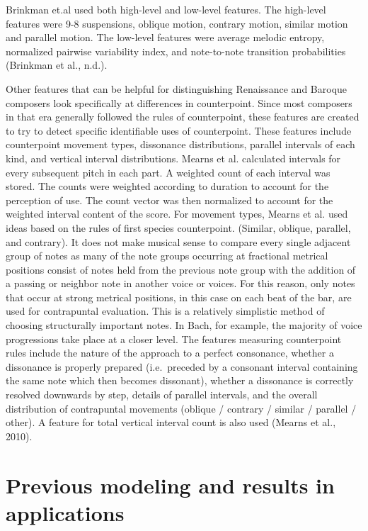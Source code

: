 \documentclass[12pt,twoside]{reedthesis}
\theoremstyle{definition}
\theoremstyle{definition}
\theoremstyle{definition}
\theoremstyle{remark}
\begin{document}
Brinkman et.al used both high-level and low-level features. The
high-level features were 9-8 suspensions, oblique motion, contrary
motion, similar motion and parallel motion. The low-level features were
average melodic entropy, normalized pairwise variability index, and
note-to-note transition probabilities (Brinkman et al., n.d.).

Other features that can be helpful for distinguishing Renaissance and
Baroque composers look specifically at differences in counterpoint.
Since most composers in that era generally followed the rules of
counterpoint, these features are created to try to detect specific
identifiable uses of counterpoint. These features include counterpoint
movement types, dissonance distributions, parallel intervals of each
kind, and vertical interval distributions. Mearns et al. calculated
intervals for every subsequent pitch in each part. A weighted count of
each interval was stored. The counts were weighted according to duration
to account for the perception of use. The count vector was then
normalized to account for the weighted interval content of the score.
For movement types, Mearns et al. used ideas based on the rules of first
species counterpoint. (Similar, oblique, parallel, and contrary). It
does not make musical sense to compare every single adjacent group of
notes as many of the note groups occurring at fractional metrical
positions consist of notes held from the previous note group with the
addition of a passing or neighbor note in another voice or voices. For
this reason, only notes that occur at strong metrical positions, in this
case on each beat of the bar, are used for contrapuntal evaluation. This
is a relatively simplistic method of choosing structurally important
notes. In Bach, for example, the majority of voice progressions take
place at a closer level. The features measuring counterpoint rules
include the nature of the approach to a perfect consonance, whether a
dissonance is properly prepared (i.e.~preceded by a consonant interval
containing the same note which then becomes dissonant), whether a
dissonance is correctly resolved downwards by step, details of parallel
intervals, and the overall distribution of contrapuntal movements
(oblique / contrary / similar / parallel / other). A feature for total
vertical interval count is also used (Mearns et al., 2010).

\section{Previous modeling and results in
applications}\label{previous-modeling-and-results-in-applications}
\end{document}
